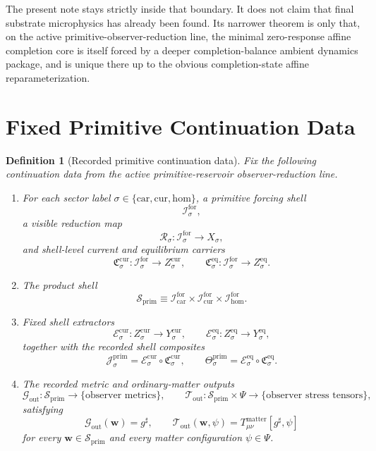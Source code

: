 \documentclass[11pt]{article}
\newcommand{\CompletedMetric}{g^{\sharp}}
\newcommand{\Car}{\mathrm{car}}
\newcommand{\Cur}{\mathrm{cur}}
\newcommand{\Hom}{\mathrm{hom}}
\newcommand{\ForSpace}[1]{\mathcal I_{#1}^{\mathrm{for}}}
\newcommand{\PrimShell}{\mathcal S_{\mathrm{prim}}}
\newcommand{\Reduction}[1]{\mathcal R_{#1}}
\newcommand{\CurrentCarrier}[1]{\mathfrak C_{#1}^{\mathrm{cur}}}
\newcommand{\EqCarrier}[1]{\mathfrak C_{#1}^{\mathrm{eq}}}
\newcommand{\CurrentExtract}[1]{\mathscr E_{#1}^{\mathrm{cur}}}
\newcommand{\EqExtract}[1]{\mathscr E_{#1}^{\mathrm{eq}}}
\newcommand{\PrimCurrent}[1]{\mathcal J_{#1}^{\mathrm{prim}}}
\newcommand{\PrimTheta}[1]{\Theta_{#1}^{\mathrm{prim}}}
\newcommand{\MetricOut}{\mathscr G_{\mathrm{out}}}
\newcommand{\MatterOut}{\mathscr T_{\mathrm{out}}}
\newtheorem{definition}{Definition}
\begin{document}
The present note stays strictly inside that boundary. It does not claim that final substrate microphysics has already been found. Its narrower theorem is only that, on the active primitive-observer-reduction line, the minimal zero-response affine completion core is itself forced by a deeper completion-balance ambient dynamics package, and is unique there up to the obvious completion-state affine reparameterization.

\section{Fixed Primitive Continuation Data}

\begin{definition}[Recorded primitive continuation data]
\label{def:fixed}
Fix the following continuation data from the active primitive-reservoir observer-reduction line.
\begin{enumerate}
    \item For each sector label \(\sigma\in\{\Car,\Cur,\Hom\}\), a primitive forcing shell
    \[
    \ForSpace{\sigma},
    \]
    a visible reduction map
    \[
    \Reduction{\sigma}:\ForSpace{\sigma}\to X_{\sigma},
    \]
    and shell-level current and equilibrium carriers
    \[
    \CurrentCarrier{\sigma}:\ForSpace{\sigma}\to Z_{\sigma}^{\mathrm{cur}},
    \qquad
    \EqCarrier{\sigma}:\ForSpace{\sigma}\to Z_{\sigma}^{\mathrm{eq}}.
    \]
    \item The product shell
    \[
    \PrimShell
    \equiv
    \ForSpace{\Car}\times \ForSpace{\Cur}\times \ForSpace{\Hom}.
    \]
    \item Fixed shell extractors
    \[
    \CurrentExtract{\sigma}:Z_{\sigma}^{\mathrm{cur}}\to Y_{\sigma}^{\mathrm{cur}},
    \qquad
    \EqExtract{\sigma}:Z_{\sigma}^{\mathrm{eq}}\to Y_{\sigma}^{\mathrm{eq}},
    \]
    together with the recorded shell composites
    \begin{equation}
    \PrimCurrent{\sigma}
    =
    \CurrentExtract{\sigma}\circ \CurrentCarrier{\sigma},
    \qquad
    \PrimTheta{\sigma}
    =
    \EqExtract{\sigma}\circ \EqCarrier{\sigma}.
    \label{eq:primcomposites}
    \end{equation}
    \item The recorded metric and ordinary-matter outputs
    \[
    \MetricOut:\PrimShell\to\{\text{observer metrics}\},
    \qquad
    \MatterOut:\PrimShell\times\Psi\to\{\text{observer stress tensors}\},
    \]
    satisfying
    \begin{equation}
    \MetricOut(\mathbf w)=\CompletedMetric,
    \qquad
    \MatterOut(\mathbf w,\psi)
    =
    T_{\mu\nu}^{\mathrm{matter}}[\CompletedMetric,\psi]
    \label{eq:fixedoutputs}
    \end{equation}
    for every \(\mathbf w\in\PrimShell\) and every matter configuration \(\psi\in\Psi\).
\end{enumerate}
\end{definition}
\end{document}
